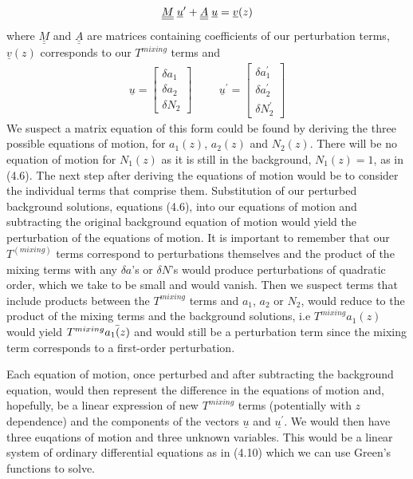 \documentclass[11pt]{report}
\numberwithin{equation}{chapter}
\begin{document}
\begin{equation}
    \underline{\underline M} \hspace{0.1cm}\underline{u}^{\prime} +\underline{\underline A} \hspace{0.1cm} \underline u=\underline{v}(z)
\end{equation}
where $\underline{\underline M}$ and $\underline{\underline A}$ are matrices containing coefficients of our perturbation terms, $\underline{v}(z)$ corresponds to our $T^{mixing}$ terms and 
\begin{align}
    \underline{u}= \begin{bmatrix}
           \delta a_{1} \\
           \delta a_{2} \\
           \delta N_{2}
         \end{bmatrix}
    \hspace{1cm}
    \underline{u}^{\prime}= \begin{bmatrix}
           \delta a_{1}^{\prime}  \\
           \delta a_{2}^{\prime}  \\
           \delta N_{2}^{\prime} 
         \end{bmatrix}
\end{align}
We suspect a matrix equation of this form could be found by deriving the three possible equations of motion, for $a_1(z)$, $a_2(z)$ and $N_2(z)$. There will be no equation of motion for $N_1(z)$ as it is still in the background, $N_1(z)=1$, as in (4.6). The next step after deriving the equations of motion would be to consider the individual terms that comprise them. Substitution of our perturbed background solutions, equations (4.6), into our equations of motion and subtracting the original background equation of motion would yield the perturbation of the equations of motion. It is important to remember that our $T^{(mixing)}$ terms correspond to perturbations themselves and the product of the mixing terms with any $\delta a$'s or $\delta N$'s would produce perturbations of quadratic order, which we take to be small and would vanish. Then we suspect terms that include products between the $T^{mixing}$ terms and $a_1$, $a_2$ or $N_2$, would reduce to the product of the mixing terms and the background solutions, i.e $T^{mixing}a_1(z)$ would yield $T^{mixing} \Bar{a_1(z)}$ and would still be a perturbation term since the mixing term corresponds to a first-order perturbation.

Each equation of motion, once perturbed and after subtracting the background equation, would then represent the difference in the equations of motion and, hopefully, be a linear expression of new $T^{mixing}$ terms (potentially with $z$ dependence) and the components of the vectors $\underline{u}$ and $\underline{u^{\prime}}$. We would then have three euqations of motion and three unknown variables. This would be a linear system of ordinary differential equations as in (4.10) which we can use Green's functions to solve. 
\end{document}
